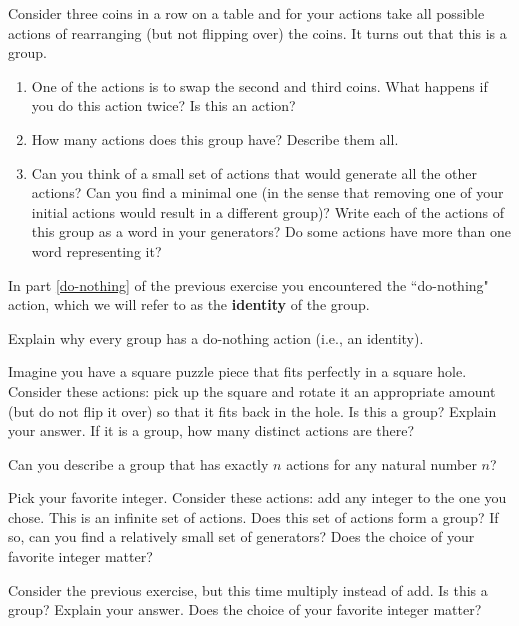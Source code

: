 \begin{exercise}
Consider three coins in a row on a table and for your actions take all possible actions of rearranging (but not flipping over) the coins.  It turns out that this is a group.
\begin{enumerate}[label=\rm{(\alph*)}]
\item\label{do-nothing} One of the actions is to swap the second and third coins.  What happens if you do this action twice?  Is this an action?  
\item How many actions does this group have?  Describe them all.
\item Can you think of a small set of actions that would generate all the other actions?  Can you find a minimal one (in the sense that removing one of your initial actions would result in a different group)?  Write each of the actions of this group as a word in your generators?  Do some actions have more than one word representing it?
\end{enumerate}
\end{exercise}

In part \ref{do-nothing} of the previous exercise you encountered the ``do-nothing" action, which we will refer to as the \textbf{identity} of the group.

\begin{exercise}
Explain why every group has a do-nothing action (i.e., an identity).
\end{exercise}

\begin{exercise}\label{exer:RotationsSquare}
Imagine you have a square puzzle piece that fits perfectly in a square hole.  Consider these actions: pick up the square and rotate it an appropriate amount (but do not flip it over) so that it fits back in the hole.  Is this a group?  Explain your answer.  If it is a group, how many distinct actions are there?
\end{exercise}

\begin{exercise}
Can you describe a group that has exactly $n$ actions for any natural number $n$?
\end{exercise}


\begin{exercise}\label{exer:introducing_Z}%
Pick your favorite integer.  Consider these actions: add any integer to the one you chose.  This is an infinite set of actions.  Does this set of actions form a group?  If so, can you find a relatively small set of generators?  Does the choice of your favorite integer matter?
\end{exercise}

\begin{exercise}
Consider the previous exercise, but this time multiply instead of add.  Is this a group?  Explain your answer. Does the choice of your favorite integer matter? 
\end{exercise}